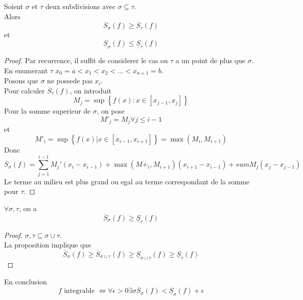 \documentclass[../main.tex]{subfiles}
\begin{document}
\begin{propo}
Soient $\sigma$ et $\tau$ deux subdivisions avec $\sigma \subseteq \tau$.\\
Alors
\[ 
	\overline{S}_\sigma( f) \geq \overline{S}_\tau( f) 
\]
et 
\[ 
	\underline{S}_\sigma( f) \leq \underline{S}_\tau( f) 
\]

\end{propo}
\begin{proof}
Par recurrence, il suffit de considerer le cas ou $\tau$ a un point de plus que $\sigma$.\\
En enumerant $\tau$ $x_0= a< x_1< x_2 < \ldots <x_{n+1} =b$.\\
Posons que $\sigma$ ne possede pas $x_i$.\\
Pour calculer $\overline{S}_\tau( f) $, on introduit
\[ 
	M_j = \sup \left\{ f( x) : x \in [ x_{j-1} , x_j]  \right\} 
\]
Pour la somme superieur de  $\sigma$, on pose
\[ 
M'_j = M_j \forall j \leq i-1
\]
et
\[ 
	M'_i = \sup \left\{ f( x) | x \in [ x_{i-1} , x_{i+1} ]  \right\} = \max ( M_i, M_{i+1}   ) 
\]
Donc
\[ 
	\overline{S}_\sigma( f)= \sum_{j=1}^{ i-1} M_{j}' ( x_i -x_{i-1} ) + \max ( M+_i , M_{i+1} ) ( x_{i+1} - x_{i-1} ) + sum M_{j} ( x_{j} - x_{j-1} ) 
\]
Le terme au milieu est plus grand ou egal au terme correspondant de la somme pour $\tau$.



\end{proof}
\begin{crly}
$\forall \sigma, \tau$, on a
\[ 
	\overline{S}_\sigma( f) \geq \underline{S}_\tau( f) 
\]

\end{crly}
\begin{proof}
$\sigma,\tau\subseteq \sigma\cup \tau$.\\
La proposition implique que
\[ 
	\overline{S}_\sigma( f) \geq \overline{S}_{\sigma\cup\tau} ( f) \geq \underline{S}_{\sigma\cup\tau} ( f) \geq \underline{S}_\tau( f) 
\]

\end{proof}
En conclusion
\[ 
	f \text{ integrable } \iff \forall \epsilon >0 \exists \sigma \overline{S}_\sigma( f) < \underline{S}_\sigma( f) + \epsilon
\]
\end{document}
